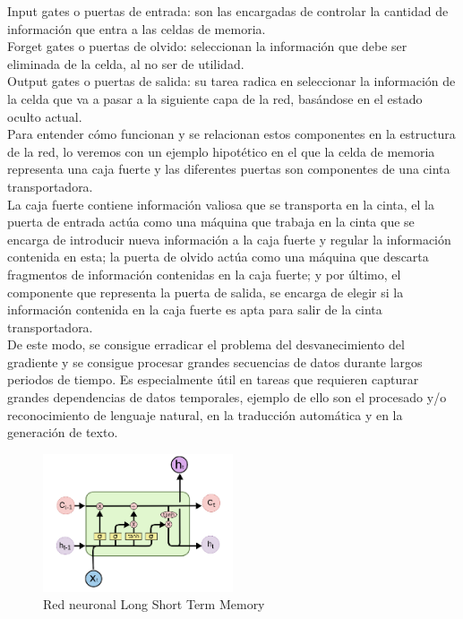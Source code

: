Input gates o puertas de entrada: son las encargadas de controlar la cantidad de información que entra a las celdas de memoria.\\

Forget gates o puertas de olvido: seleccionan la información que debe ser eliminada de la celda, al no ser de utilidad.\\

Output gates o puertas de salida: su tarea radica en seleccionar la información de la celda que va a pasar a la siguiente capa de la red, basándose en el estado oculto actual.\\

Para entender cómo funcionan y se relacionan estos componentes en la estructura de la red, lo veremos con un ejemplo hipotético en el que la celda de memoria representa una caja fuerte y las diferentes puertas son componentes de una cinta transportadora. \\

La caja fuerte contiene información valiosa que se transporta en la cinta, el la puerta de entrada actúa como una máquina que trabaja en la cinta que se encarga de introducir nueva información a la caja fuerte y regular la información contenida en esta; la puerta de olvido actúa como una máquina que descarta fragmentos de información contenidas en la caja fuerte; y por último, el componente que representa la puerta de salida, se encarga de elegir si la información contenida en la caja fuerte es apta para salir de la cinta transportadora. \\

De este modo, se consigue erradicar el problema del desvanecimiento del gradiente y se consigue procesar grandes secuencias de datos durante largos periodos de tiempo. Es especialmente útil en tareas que requieren capturar grandes dependencias de datos temporales, ejemplo de ello son el procesado y/o reconocimiento de lenguaje natural, en la traducción automática y en la generación de texto.
\begin{figure}[h]
	\centering
	\includegraphics[width = 0.5\textwidth]{Imagenes/Vectorial/lstm.png}
	\caption{Red neuronal Long Short Term Memory}
	\label{fig:sampleImage}
\end{figure}



